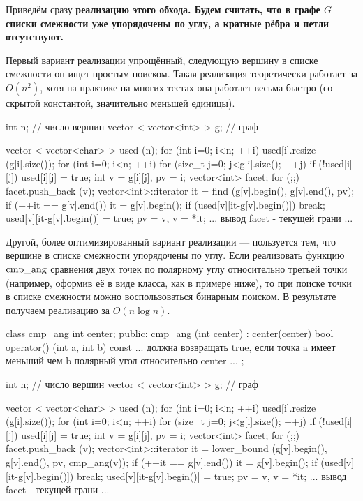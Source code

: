 Приведём сразу \bf{реализацию} этого обхода. Будем считать, что в графе $G$ списки смежности уже упорядочены по углу, а кратные рёбра и петли отсутствуют.

Первый вариант реализации упрощённый, следующую вершину в списке смежности он ищет простым поиском. Такая реализация теоретически работает за $O(n^2)$, хотя на практике на многих тестах она работает весьма быстро (со скрытой константой, значительно меньшей единицы).

\code
int n; // число вершин
vector < vector<int> > g; // граф

vector < vector<char> > used (n);
for (int i=0; i<n; ++i)
	used[i].resize (g[i].size());
for (int i=0; i<n; ++i)
	for (size_t j=0; j<g[i].size(); ++j)
		if (!used[i][j]) {
			used[i][j] = true;
			int v = g[i][j],  pv = i;
			vector<int> facet;
			for (;;) {
				facet.push_back (v);
				vector<int>::iterator it = find (g[v].begin(), g[v].end(), pv);
				if (++it == g[v].end())  it = g[v].begin();
				if (used[v][it-g[v].begin()])  break;
				used[v][it-g[v].begin()] = true;
				pv = v,  v = *it;
			}
			... вывод facet - текущей грани ...
		}
\endcode

Другой, более оптимизированный вариант реализации --- пользуется тем, что вершине в списке смежности упорядочены по углу. Если реализовать функцию $\rm cmp\_ang$ сравнения двух точек по полярному углу относительно третьей точки (например, оформив её в виде класса, как в примере ниже), то при поиске точки в списке смежности можно воспользоваться бинарным поиском. В результате получаем реализацию за $O(n \log n)$.

\code
class cmp_ang {
	int center;
public:
	cmp_ang (int center) : center(center)
		{ }
	bool operator() (int a, int b) const {
		... должна возвращать true, если точка a имеет
		меньший чем b полярный угол относительно center ...
	}
};


int n; // число вершин
vector < vector<int> > g; // граф

vector < vector<char> > used (n);
for (int i=0; i<n; ++i)
	used[i].resize (g[i].size());
for (int i=0; i<n; ++i)
	for (size_t j=0; j<g[i].size(); ++j)
		if (!used[i][j]) {
			used[i][j] = true;
			int v = g[i][j],  pv = i;
			vector<int> facet;
			for (;;) {
				facet.push_back (v);
				vector<int>::iterator it = lower_bound (g[v].begin(), g[v].end(),
					pv, cmp_ang(v));
				if (++it == g[v].end())  it = g[v].begin();
				if (used[v][it-g[v].begin()])  break;
				used[v][it-g[v].begin()] = true;
				pv = v,  v = *it;
			}
			... вывод facet - текущей грани ...
		}
\endcode

